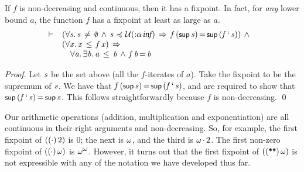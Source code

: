 \documentclass[11pt]{llncs}
\renewcommand{\HOLConst}[1]{{\textsf{\upshape\small #1}}}
\renewcommand{\HOLTyOp}[1]{\mbox{\fontencoding{T1}\fontfamily{bch}\fontseries{m}\fontshape{it}\fontsize{9.5}{10}\selectfont #1}}
\renewcommand{\HOLinline}[1]{\ensuremath{#1}}
\newcommand{\holthmenv}[1]{\begin{array}[t]{l}#1\end{array}}
\begin{document}
\begin{theorem}
\label{thm:fixpoints-exist}
If $f$ is non-decreasing and continuous, then it has a fixpoint.
In fact, for \emph{any} lower bound $a$, the function $f$ has a fixpoint at least as large as $a$.
\renewcommand{\arraystretch}{1.2}
\[
\vdash\;\holthmenv{(\ensuremath{{\forall}}\HOLBoundVar{s}\ensuremath{.}\,\HOLBoundVar{s}\,\HOLTokenNotEqual{}\,\HOLConst{\HOLTokenEmpty{}}\,\HOLTokenConj{}\,\HOLBoundVar{s}\,\ensuremath{{\,\HOLTokenIsPrefix\,}}\,\ensuremath{\cal{U}}(\ensuremath{{:}}\ensuremath{\alpha}\,\HOLTyOp{inf})\,\HOLTokenImp{}\,\HOLFreeVar{f}\,(\HOLConst{sup}\,\HOLBoundVar{s})\,{\ensuremath{=}}\,\HOLConst{sup}\,(\HOLFreeVar{f}\,\textrm{`}\,\HOLBoundVar{s}))\,\HOLTokenConj{}\\
(\ensuremath{{\forall}}\HOLBoundVar{x}\ensuremath{.}\,\HOLBoundVar{x}\,\HOLTokenLeq{}\,\HOLFreeVar{f}\,\HOLBoundVar{x})\,\HOLTokenImp{}\\
\,\,\,\,\,\,\ensuremath{{\forall}}\HOLBoundVar{a}\ensuremath{.}\,\ensuremath{{\exists}}\HOLBoundVar{b}\ensuremath{.}\,\HOLBoundVar{a}\,\HOLTokenLeq{}\,\HOLBoundVar{b}\,\HOLTokenConj{}\,\HOLFreeVar{f}\,\HOLBoundVar{b}\,{\ensuremath{=}}\,\HOLBoundVar{b}}
\]
\end{theorem}
\begin{proof}
Let \HOLinline{\HOLFreeVar{s}} be the set above (all the $f$-iterates of $a$).
Take the fixpoint to be the supremum of \HOLinline{\HOLFreeVar{s}}.
We have that \HOLinline{\HOLFreeVar{f}\,(\HOLConst{sup}\,\HOLFreeVar{s})\,{\ensuremath{=}}\,\HOLConst{sup}\,(\HOLFreeVar{f}\,\textrm{`}\,\HOLFreeVar{s})}, and are required to show that \HOLinline{\HOLConst{sup}\,(\HOLFreeVar{f}\,\textrm{`}\,\HOLFreeVar{s})\,{\ensuremath{=}}\,\HOLConst{sup}\,\HOLFreeVar{s}}.
This follows straightforwardly because $f$ is non-decreasing.
\qed
\end{proof}

Our arithmetic operations (addition, multiplication and exponentiation) are all continuous in their right arguments and non-decreasing.
So, for example, the first fixpoint of $(\HOLinline{(\HOLConst{\ensuremath{{\cdot}}})\,2})$ is \HOLinline{0}; the next is \HOLinline{\HOLConst{\ensuremath{\omega}}}, and the third is \HOLinline{\HOLConst{\ensuremath{\omega}}\,\ensuremath{{\cdot}}\,2}.
The first non-zero fixpoint of $(\HOLinline{(\HOLConst{\ensuremath{{\cdot}}})\,\HOLConst{\ensuremath{\omega}}})$ is \HOLinline{\HOLConst{\ensuremath{\omega}}\sp{\HOLConst{\ensuremath{\omega}}}}.
However, it turns out that the first fixpoint of $(\HOLinline{(\HOLConst{\HOLTokenExp{}})\,\HOLConst{\ensuremath{\omega}}})$ is not expressible with any of the notation we have developed thus far.
\end{document}
